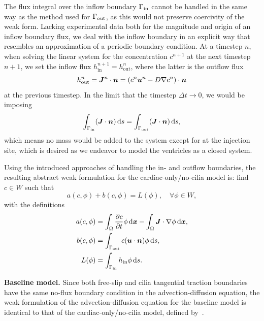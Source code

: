 \documentclass{WileyMSP-template}
\begin{document}
The flux integral over the inflow boundary $\Gamma_{\mathrm{in}}$ cannot be handled
in the same way as the method used for $\Gamma_{\mathrm{out}}$, as this would not preserve
coercivity of the weak form. Lacking experimental data both for the magnitude and
origin of an inflow boundary flux, we deal with the inflow boundary in an explicit
way that resembles an approximation of a periodic boundary condition. At a timestep $n$,
when solving the linear system for the concentration $c^{n+1}$ at the next timestep $n+1$,
we set the inflow flux $h_{\mathrm{in}}^{n+1} = h_{\mathrm{out}}^{n}$, where the
latter is the outflow flux
\begin{equation*}
    h_{\mathrm{out}}^{n} = \bm{J}^n\cdot\bm{n} = (c^n\bm{u}^n - D\nabla c^n)\cdot\bm{n}
\end{equation*}
at the previous timestep. In the limit that the timestep $\Delta t\to 0$, we would be imposing
\begin{equation*}
    \int_{\Gamma_{\mathrm{in}}}(\bm{J}\cdot\bm{n}) \, \mathrm ds = \int_{\Gamma_{\mathrm{out}}}(\bm{J}\cdot\bm{n}) \, \mathrm ds,
\end{equation*}
which means no mass would be added to the system except for at the injection site,
which is desired as we endeavor to model the ventricles as a closed system.

Using the introduced approaches of handling the in- and outflow boundaries,
the resulting abstract weak formulation for the cardiac-only/no-cilia model is:
find $c\in W$ such that
\begin{equation}
    a(c, \phi) + b(c, \phi) = L(\phi), \quad\forall\phi\in W, \label{eq:adv_diff_weak_formB}
\end{equation}
with the definitions
\begin{align}
    a(c, \phi) &= \int_{\Omega}\frac{\partial c}{\partial t}\phi \, \mathrm d\bm{x} - \int_{\Omega}\bm{J}\cdot\nabla\phi \, \mathrm d\bm{x},
    \label{eq:adv_diff_bilinear_form}\\
    b(c, \phi) &= \int_{\Gamma_{\mathrm{out}}}c(\bm{u}\cdot\bm{n})\phi \, \mathrm ds, \label{eq:adv_diff_skew_form} \\
    L(\phi) &= \int_{\Gamma_{\mathrm{in}}}h_{\mathrm{in}}\phi \, \mathrm ds.\label{eq:adv_diff_linear_form}
\end{align}

\textbf{Baseline model.} Since both free-slip and cilia tangential
traction boundaries have the same no-flux boundary condition
in the advection-diffusion equation, the weak formulation of
the advection-diffusion equation for the baseline model is
identical to that of the cardiac-only/no-cilia model,
defined by~.
\end{document}
